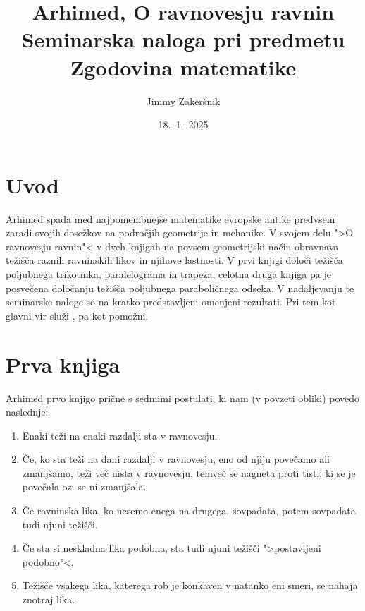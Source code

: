 \documentclass[a4paper, 10pt]{article}
\title{Arhimed, O ravnovesju ravnin\\ {\large Seminarska naloga pri predmetu Zgodovina matematike}}
\date{18.~1.~2025}
\author{Jimmy Zakeršnik}
\begin{document}
	\maketitle
	\thispagestyle{empty}
	\newpage
	\newpage
	\section{Uvod}
		Arhimed spada med najpomembnejše matematike evropske antike predvsem zaradi svojih dosežkov na področjih geometrije in mehanike. V svojem delu ">O ravnovesju ravnin"< v dveh knjigah na povsem geometrijski način obravnava težišča raznih ravninskih likov in njihove lastnosti. V prvi knjigi določi težišča poljubnega trikotnika, paralelograma in trapeza, celotna druga knjiga pa je posvečena določanju težišča poljubnega paraboličnega odseka. V nadaljevanju te seminarske naloge so na kratko predstavljeni omenjeni rezultati. Pri tem kot glavni vir služi \cite{bib:Heath}, \cite{bib:Mendell} pa kot pomožni.
	\section{Prva knjiga}
		Arhimed prvo knjigo prične s sedmimi postulati, ki nam (v povzeti obliki) povedo naslednje: \begin{enumerate}
			\item Enaki teži na enaki razdalji sta v ravnovesju.
			\item Če, ko sta teži na dani razdalji v ravnovesju, eno od njiju povečamo ali zmanjšamo, teži več nista v ravnovesju, temveč se nagneta proti tisti, ki se je povečala oz. se ni zmanjšala.
			\item Če ravninska lika, ko nesemo enega na drugega, sovpadata, potem sovpadata tudi njuni težišči.
			\item Če sta si neskladna lika podobna, sta tudi njuni težišči ">postavljeni podobno"<. 
			\item Težišče vsakega lika, katerega rob je konkaven v natanko eni smeri, se nahaja znotraj lika.
		\end{enumerate}
		
\end{document}
